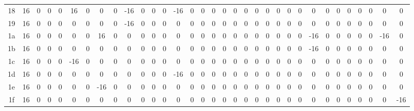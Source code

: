 \documentclass[11pt]{article}
\begin{document}
\begin{table}[htbp]
{\begin{tabular}{c|*{32}{c}}
    18 & 16 & 0 & 0 & 0 & 16 & 0 & 0 & 0 & -16 & 0 & 0 & 0 & -16 & 0 & 0 & 0 & 0 & 0 & 0 & 0 & 0 & 0 & 0 & 0 & 0 & 0 & 0 & 0 & 0 & 0 & 0 & 0\\
    19 & 16 & 0 & 0 & 0 & 0 & 0 & 0 & 0 & -16 & 0 & 0 & 0 & 0 & 0 & 0 & 0 & 0 & 0 & 0 & 0 & 0 & 0 & 0 & 0 & 0 & 0 & 0 & 0 & 0 & 0 & 0 & 0\\
    1a & 16 & 0 & 0 & 0 & 0 & 0 & 16 & 0 & 0 & 0 & 0 & 0 & 0 & 0 & 0 & 0 & 0 & 0 & 0 & 0 & 0 & 0 & 0 & 0 & -16 & 0 & 0 & 0 & 0 & 0 & -16 & 0\\
    1b & 16 & 0 & 0 & 0 & 0 & 0 & 0 & 0 & 0 & 0 & 0 & 0 & 0 & 0 & 0 & 0 & 0 & 0 & 0 & 0 & 0 & 0 & 0 & 0 & -16 & 0 & 0 & 0 & 0 & 0 & 0 & 0\\
    1c & 16 & 0 & 0 & 0 & -16 & 0 & 0 & 0 & 0 & 0 & 0 & 0 & 0 & 0 & 0 & 0 & 0 & 0 & 0 & 0 & 0 & 0 & 0 & 0 & 0 & 0 & 0 & 0 & 0 & 0 & 0 & 0\\
    1d & 16 & 0 & 0 & 0 & 0 & 0 & 0 & 0 & 0 & 0 & 0 & 0 & -16 & 0 & 0 & 0 & 0 & 0 & 0 & 0 & 0 & 0 & 0 & 0 & 0 & 0 & 0 & 0 & 0 & 0 & 0 & 0\\
    1e & 16 & 0 & 0 & 0 & 0 & 0 & -16 & 0 & 0 & 0 & 0 & 0 & 0 & 0 & 0 & 0 & 0 & 0 & 0 & 0 & 0 & 0 & 0 & 0 & 0 & 0 & 0 & 0 & 0 & 0 & 0 & 0\\
    1f & 16 & 0 & 0 & 0 & 0 & 0 & 0 & 0 & 0 & 0 & 0 & 0 & 0 & 0 & 0 & 0 & 0 & 0 & 0 & 0 & 0 & 0 & 0 & 0 & 0 & 0 & 0 & 0 & 0 & 0 & 0 & -16\\
\bottomrule
\end{tabular}
}
\end{table}
\end{document}
